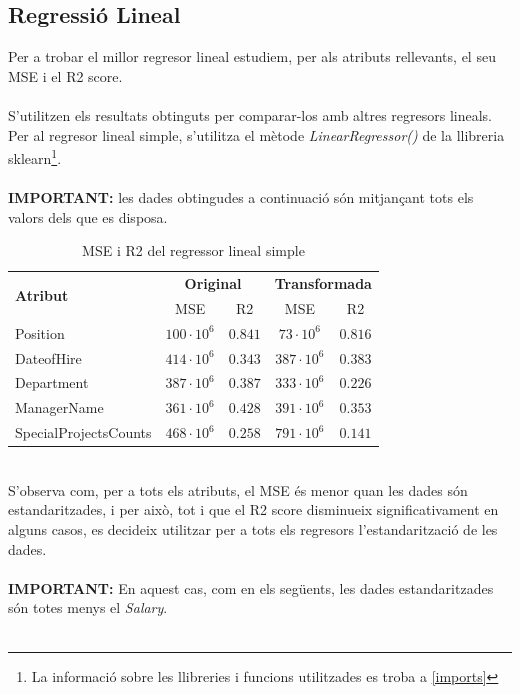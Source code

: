 \documentclass[a4paper, 11pt]{article}
\begin{document}
\subsection{Regressió Lineal}\label{lineal_simple}
Per a trobar el millor regresor lineal estudiem, per als atributs rellevants, el seu MSE i el R2 score.\\\\
S'utilitzen els resultats obtinguts per comparar-los amb altres regresors lineals. \\
Per al regresor lineal simple, s'utilitza el mètode \textit{LinearRegressor()} de la llibreria sklearn\footnote{La informació sobre les llibreries i funcions utilitzades es troba a \textcolor{blue}{\ref{imports}}}.\\\\
\textbf{IMPORTANT:} les dades obtingudes a continuació són mitjançant tots els valors dels que es disposa.
\begin{table}[h]
  \centering
  \begin{tabular}{l||c|c||c|c}
        \multirow{2}{*}{\textbf{Atribut}} & \multicolumn{2}{c||}{\textbf{Original}} & \multicolumn{2}{c}{\textbf{Transformada}}\\
        & MSE & R2 & MSE & R2 \\ \hline \hline
        Position & $100\cdot 10^6$ & $0.841$ & $73\cdot 10^6$ & $0.816$\\\hline
        DateofHire & $414\cdot 10^6$ & $0.343$ & $387\cdot 10^6$ & $0.383$\\\hline
        Department & $387\cdot 10^6$ & $0.387$ & $333\cdot 10^6$ & $0.226$\\\hline
        ManagerName & $361\cdot 10^6$ & $0.428$ & $391\cdot 10^6$ & $0.353$\\\hline
        SpecialProjectsCounts & $468\cdot 10^6$ & $0.258$ & $791\cdot 10^6$ & $0.141$\\
    \end{tabular}
    \caption{MSE i R2 del regressor lineal simple}
    \label{tab:my_label}
\end{table}\\
S'observa com, per a tots els atributs, el MSE és menor quan les dades són estandaritzades, i per això, tot i que el R2 score disminueix  significativament en alguns casos, es decideix utilitzar per a tots els regresors l'estandarització  de les dades.\\\\
\textbf{IMPORTANT:} En aquest cas, com en els següents, les dades estandaritzades són totes menys el \textit{Salary}.\\\\
\end{document}
